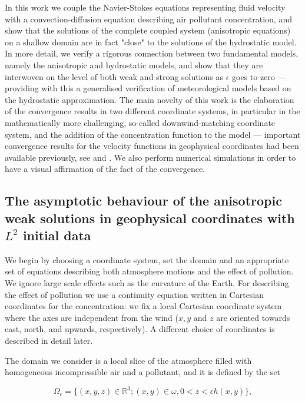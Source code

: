 \documentclass[11pt]{article}
\begin{document}
In this work we couple the Navier-Stokes equations representing fluid velocity with a convection-diffusion equation describing air pollutant concentration, and show that the solutions of the complete coupled system (anisotropic equations) on a shallow domain are in fact "close" to the solutions of the hydrostatic model. In more detail, we verify a rigorous connection between two fundamental models, namely the anisotropic and hydrostatic models, and show that they are interwoven on the level of both weak and strong solutions as $\epsilon$ goes to zero --- providing with this a generalised verification of meteorological models based on the hydrostatic approximation. The main novelty of this work is the elaboration of the convergence results in two different coordinate systems, in particular in the mathematically more challenging, so-called downwind-matching coordinate system, and the addition of the concentration function to the model --- important convergence results for the velocity functions in geophysical coordinates had been available previously, see \cite{azerad2001mathematical} and \cite{li2019primitive}. We also perform numerical simulations in order to have a visual affirmation of the fact of the convergence.

\subsection{The asymptotic behaviour of the anisotropic weak solutions in geophysical coordinates with $L^2$ initial data}

We begin by choosing a coordinate system, set the domain and an appropriate set of equations describing both atmosphere motions and the effect of pollution. We ignore large scale effects such as the curvature of the Earth. For describing the effect of pollution we use a continuity equation written in Cartesian coordinates for the concentration: we fix a local Cartesian coordinate system where the axes are independent from the wind ($x, y$ and $z$ are oriented towards east, north, and upwards, respectively). A different choice of coordinates is described in detail later.

The domain we consider is a local slice of the atmosphere filled with homogeneous incompressible air and a pollutant, and it is defined by the set

\begin{equation}
  \Omega_{\epsilon} = \{(x,y,z) \in \mathbb{R}^3 ; (x,y) \in \omega, 0 < z < \epsilon h(x,y) \},
\end{equation}
\end{document}
